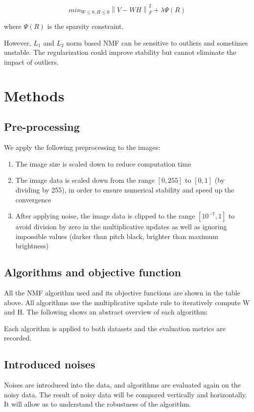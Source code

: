 \documentclass{article} %
\begin{document}
\begin{equation}
min_{W \leq 0, H \leq 0}\left\|V - WH\right\|_F^2 + \lambda\Psi\left(R\right)
\end{equation}

where $\Psi\left(R\right)$ is the sparsity constraint.

However, $L_1$ and $L_2$ norm based NMF can be sensitive to outliers and sometimes unstable. The regularization could improve stability but cannot eliminate the impact of outliers.

\section{Methods}
\subsection{Pre-processing}
We apply the following preprocessing to the images:
\begin{enumerate}
\item The image size is scaled down to reduce computation time
\item The image data is scaled down from the range $\left[0,255\right]$ to $\left[0,1\right]$ (by dividing by 255), in order to ensure numerical stability and speed up the convergence
\item After applying noise, the image data is clipped to the range $\left[10^{-7},1\right]$ to avoid division by zero in the multiplicative updates as well as ignoring impossible values (darker than pitch black, brighter than maximum brightness)
\end{enumerate}

\subsection{Algorithms and objective function}
All the NMF algorithm used and its objective functions are shown in the table above. All algorithms use the multiplicative update rule to iteratively compute W and H. The following shows an abstract overview of each algorithm:

Each algorithm is applied to both datasets and the evaluation metrics are recorded.

\subsection{Introduced noises}
Noises are introduced into the data, and algorithms are evaluated again on the noisy data. The result of noisy data will be compared vertically and horizontally. It will allow us to understand the robustness of the algorithm.
\end{document}

